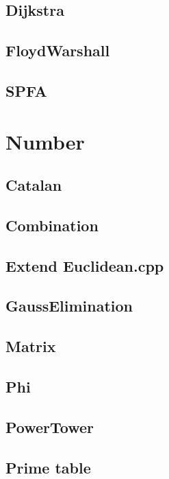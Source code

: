 \subsection{Dijkstra}

\subsection{FloydWarshall}

\subsection{SPFA}


\section{Number}

\subsection{Catalan}

\subsection{Combination}

\subsection{Extend Euclidean.cpp}

\subsection{GaussElimination}

\subsection{Matrix}

\subsection{Phi}

\subsection{PowerTower}

\subsection{Prime table}


